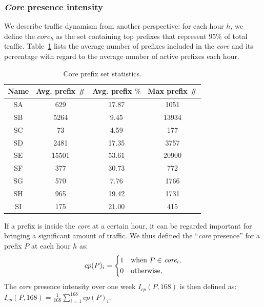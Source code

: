 \subsubsection{\textit{Core} presence intensity}

We describe traffic dynamism from another perspective:
for each hour $h$, we define the $core_h$ as the set containing top prefixes that represent $95\%$ of total traffic. 
Table~\ref{tab:core_size} lists the average number of prefixes included in the \textit{core} and its percentage with regard to the average number of active prefixes each hour. 

\begin{table}[!htb]
\centering
\begin{tabular}{cccc}\toprule
\textbf{Name} & \textbf{Avg. prefix \#} & \textbf{Avg. prefix $\%$} & \textbf{Max prefix \#}\\
\midrule
SA & 629  & 17.87  & 1051\\
SB & 5264 & 9.45  & 13934\\
SC & 73  & 4.59    & 177\\
SD & 2481  & 17.35 & 3757\\
SE & 15501  & 53.61 & 20900\\
SF & 377  & 30.73    & 772\\
SG & 570 & 7.76    & 1766\\
SH & 965  & 19.42   & 1731\\
SI & 175  & 21.00    & 415\\
\bottomrule
\end{tabular}
\caption{Core prefix set statistics.}
\label{tab:core_size}
\end{table}

If a prefix is inside the \textit{core} at a certain hour, it can be regarded important for bringing a significant amount of traffic.
We thus defined the ``\textit{core} presence'' for a prefix $P$ at each hour $h$ as:
\begin{equation*}
cp(P)_i = \begin{dcases*}
        1  & when $P \in$ $\textit{core}_i$,\\
        0 & otherwise,
        \end{dcases*}
\label{eq:cp}
\end{equation*}
The \textit{core} presence intensity over one week $I_{cp}(P, 168)$ is then defined as:
$I_{cp}(P,168) = \frac{1}{168} \sum_{i=1}^{168} cp(P)_i$.


